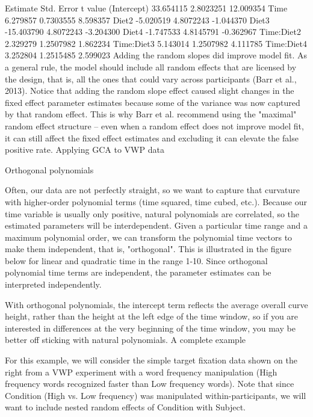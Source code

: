              Estimate Std. Error   t value
(Intercept)  33.654115  2.8023251 12.009354
Time          6.279857  0.7303555  8.598357
Diet2        -5.020519  4.8072243 -1.044370
Diet3       -15.403790  4.8072243 -3.204300
Diet4        -1.747533  4.8145791 -0.362967
Time:Diet2    2.329279  1.2507982  1.862234
Time:Diet3    5.143014  1.2507982  4.111785
Time:Diet4    3.252804  1.2515485  2.599023
Adding the random slopes did improve model fit. As a general rule, the model should include all random effects that are licensed by the design, that is, all the ones that could vary across participants (Barr et al., 2013). Notice that adding the random slope effect caused slight changes in the fixed effect parameter estimates because some of the variance was now captured by that random effect. This is why Barr et al. recommend using the "maximal" random effect structure -- even when a random effect does not improve model fit, it can still affect the fixed effect estimates and excluding it can elevate the false positive rate.
Applying GCA to VWP data

Orthogonal polynomials

Often, our data are not perfectly straight, so we want to capture that curvature with higher-order polynomial terms (time squared, time cubed, etc.). Because our time variable is usually only positive, natural polynomials are correlated, so the estimated parameters will be interdependent. Given a particular time range and a maximum polynomial order, we can transform the polynomial time vectors to make them independent, that is, "orthogonal". This is illustrated in the figure below for linear and quadratic time in the range 1-10. Since orthogonal polynomial time terms are independent, the parameter estimates can be interpreted independently.
 
With orthogonal polynomials, the intercept term reflects the average overall curve height, rather than the height at the left edge of the time window, so if you are interested in differences at the very beginning of the time window, you may be better off sticking with natural polynomials.
A complete example

For this example, we will consider the simple target fixation data shown on the right from a VWP experiment with a word frequency manipulation (High frequency words recognized faster than Low frequency words). Note that since Condition (High vs. Low frequency) was manipulated within-participants, we will want to include nested random effects of Condition with Subject.


